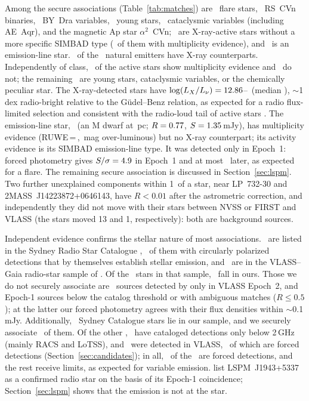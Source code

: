 \documentclass[linenumbers]{aastex702}
\newcommand{\Lnu}{L_\nu}
\begin{document}
Among the secure associations (Table~\ref{tab:matches}) are \NCFlare\ flare stars, \NCRS\ RS~CVn binaries, \NCBY\ BY~Dra variables, \NCYoung\ young stars, \NCCV\ cataclysmic variables (including AE~Aqr), and the magnetic Ap star $\alpha^2$~CVn; \NCXA\ are X-ray-active stars without a more specific SIMBAD type (\NXAMult\ of them with multiplicity evidence), and \NCEm\ is an emission-line star. \NSecureX\ of the \NNatural\ natural emitters have X-ray counterparts. Independently of class, \NGrpMult\ of the active stars show multiplicity evidence and \NGrpSingle\ do not; the remaining \NGrpOther\ are young stars, cataclysmic variables, or the chemically peculiar star. The X-ray-detected stars have $\log(L_X/\Lnu)=\GBmin$--\GBmax\ (median \GBmed), $\sim$1\,dex radio-bright relative to the G\"udel--Benz relation, as expected for a radio flux-limited selection and consistent with the radio-loud tail of active stars \citep{Vedantham2022}. The emission-line star, \EmSecName\ (an M dwarf at \EmSecDist\,pc; $R=0.77$, $S=1.35$\,mJy), has multiplicity evidence (RUWE\,=\,\EmSecRUWE, \EmSecdMG\,mag over-luminous) but no X-ray counterpart; its activity evidence is its SIMBAD emission-line type. It was detected only in Epoch~1: forced photometry gives $S/\sigma=4.9$ in Epoch~1 and at most \EmSecSNRlater\ later, as expected for a flare. The remaining secure association is discussed in Section~\ref{sec:lspm}. Two further unexplained components within 1\arcsec\ of a star, near LP~732-30 and 2MASS~J14223872+0646143, have $R<0.01$ after the astrometric correction, and independently they did not move with their stars between NVSS or FIRST and VLASS (the stars moved 13 and 1, respectively): both are background sources.

Independent evidence confirms the stellar nature of most associations. \NSRSC\ are listed in the Sydney Radio Star Catalogue \citep{Driessen2024}, \NSRSCV\ of them with circularly polarized detections that by themselves establish stellar emission, and \NDeOverlap\ are in the VLASS--Gaia radio-star sample of \citet{De2024}. Of the \NDeTotal\ stars in that sample, \NDeInSample\ fall in ours. Those we do not securely associate are \NDeEpTwoOnly\ sources detected by \citet{De2024} only in VLASS Epoch~2, and Epoch-1 sources below the catalog threshold or with ambiguous matches ($R\le0.5$); at the latter our forced photometry agrees with their flux densities within $\sim$0.1\,mJy. Additionally, \NSRSCinSample\ Sydney Catalogue stars lie in our sample, and we securely associate \NSRSCdet\ of them. Of the other \NSRSCundet, \NSRSClow\ have cataloged detections only below 2\,GHz (mainly RACS and LoTSS), and \NSRSCvlass\ were detected in VLASS, \NSRSCvlassCand\ of which are forced detections (Section~\ref{sec:candidates}); in all, \NSRSCcand\ of the \NSRSCundet\ are forced detections, and the rest receive limits, as expected for variable emission. \citet{De2024} list LSPM~J1943+5337 as a confirmed radio star on the basis of its Epoch-1 coincidence; Section~\ref{sec:lspm} shows that the emission is not at the star.
\end{document}
